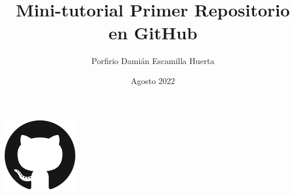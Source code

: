 

\title{Mini-tutorial Primer Repositorio en GitHub}
\author{Porfirio Damián Escamilla Huerta}
\date{Agosto 2022}

\lstset{style=bashStyle}


	
	\maketitle
	\begin{center}
		\includegraphics[width=120px]{GitHub-Mark-120px-plus.png}
	\end{center}
	\newpage
	
	
	
	
	
	
	

